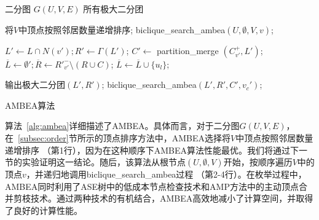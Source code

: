 \begin{algorithm}[H]
  \begin{algorithmic}[1]
    \normalsize
    \REQUIRE 二分图 $G(U,V,E)$
    \ENSURE 所有极大二分团
    
    \renewcommand{\algorithmicwhile}{\textbf{procedure}}
    \renewcommand{\algorithmicdo}{\textbf{:}}

    \STATE 将$V$中顶点按照邻居数量递增排序;
      \STATE \textsf{biclique\_search\_ambea}$(U,\emptyset,V,v)$;
    \ENDFOR

    \renewcommand{\algorithmicdo}{\textbf{do}}
      \STATE $L' \leftarrow L \cap N(v'); R' \leftarrow \Gamma(L')$;
      \STATE $C' \leftarrow$ \textsf{partition\_merge}    $(C_{v'}^+, L')$;
      \STATE $\overline{L} \leftarrow \emptyset'; \overline{R}\leftarrow {R'}_{v'}^- \setminus (R \cup C)$;
          \STATE $\overline{L} \leftarrow \overline{L} \cup \{u_l\}$;
        \ENDIF
      \ENDFOR

        \STATE 输出极大二分团$(L', R')$;
            \STATE \textsf{biclique\_search\_ambea}$(L', R', C', v_c')$;
          \ENDIF
        \ENDFOR
      \ENDIF
    \ENDWHILE

  \end{algorithmic}
  \caption{AMBEA算法}
  \label{alg:ambea}
\end{algorithm}

算法~\ref{alg:ambea}详细描述了AMBEA。具体而言，对于二分图$G(U,V,E)$，在~\ref{subsec:order}节所示的顶点排序方法中，AMBEA选择将$V$中顶点按照邻居数量递增排序 （第1行），因为在这种顺序下AMBEA算法性能最优。我们将通过下一节的实验证明这一结论。随后，该算法从根节点$(U,\emptyset,V)$开始，按顺序遍历$V$中的顶点$v$，并递归地调用\textsf{biclique\_search\_ambea}过程 （第2-4行）。在枚举过程中，AMBEA同时利用了ASE树中的低成本节点检查技术和AMP方法中的主动顶点合并剪枝技术。通过两种技术的有机结合，AMBEA高效地减小了计算空间，并取得了良好的计算性能。

